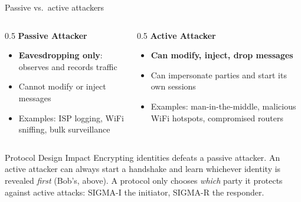 \ifdefined\PRESENTATION\else\PassOptionsToClass{handout}{beamer}\fi\documentclass[aspectratio=169, lualatex]{beamer}
\begin{document}
\begin{frame}{Passive vs.\ active attackers}
	\begin{columns}
		\begin{column}{0.5\textwidth}
			\textbf{Passive Attacker}
			\begin{itemize}
				\item \textbf{Eavesdropping only}: observes and records traffic
				\item Cannot modify or inject messages
				\item Examples: ISP logging, WiFi sniffing, bulk surveillance
			\end{itemize}
		\end{column}
		\begin{column}{0.5\textwidth}
			\textbf{Active Attacker}
			\begin{itemize}
				\item \textbf{Can modify, inject, drop messages}
				\item Can impersonate parties and start its own sessions
				\item Examples: man-in-the-middle, malicious WiFi hotspots, compromised routers
			\end{itemize}
		\end{column}
	\end{columns}
	\begin{alertblock}{Protocol Design Impact}
		Encrypting identities defeats a passive attacker. An active attacker can always start a handshake and learn whichever identity is revealed \textit{first} (Bob's, above). A protocol only chooses \textit{which} party it protects against active attacks: SIGMA-I the initiator, SIGMA-R the responder.
	\end{alertblock}
\end{frame}
\end{document}
